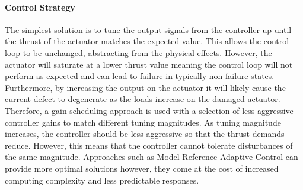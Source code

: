 \paragraph{Control Strategy}
The simplest solution is to tune the output signals from the controller up until the thrust of the actuator matches the expected value. This allows the control loop to be unchanged, abstracting from the physical effects. However, the actuator will saturate at a lower thrust value meaning the control loop will not perform as expected and can lead to failure in typically non-failure states. Furthermore, by increasing the output on the actuator it will likely cause the current defect to degenerate as the loads increase on the damaged actuator. Therefore, a gain scheduling approach is used with a selection of less aggressive controller gains to match different tuning magnitudes. As tuning magnitude increases, the controller should be less aggressive so that the thrust demands reduce. However, this means that the controller cannot tolerate disturbances of the same magnitude. Approaches such as Model Reference Adaptive Control can provide more optimal solutions however, they come at the cost of increased computing complexity and less predictable responses.